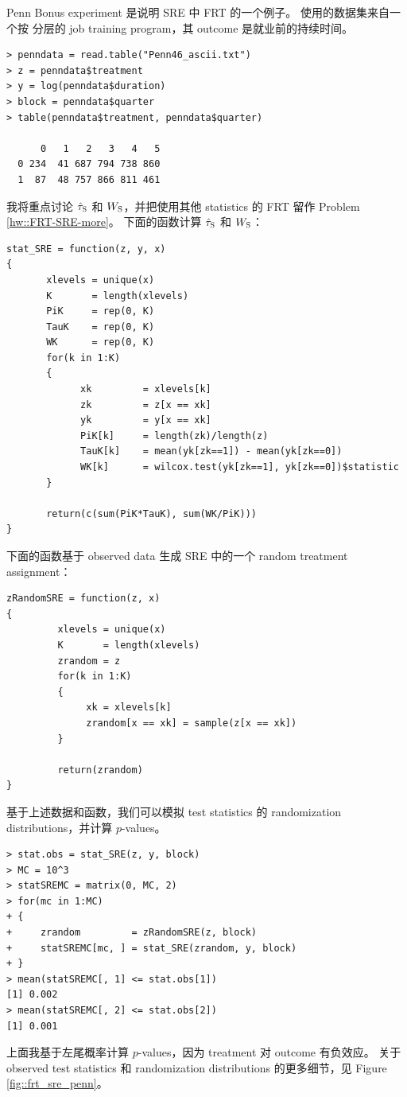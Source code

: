  
 
Penn Bonus experiment 是说明 SRE 中 FRT 的一个例子。\citet{koenker2002inference} 使用的数据集来自一个按  分层的 job training program，其 outcome 是就业前的持续时间。

\begin{lstlisting}
> penndata = read.table("Penn46_ascii.txt")
> z = penndata$treatment
> y = log(penndata$duration)
> block = penndata$quarter
> table(penndata$treatment, penndata$quarter)
   
      0   1   2   3   4   5
  0 234  41 687 794 738 860
  1  87  48 757 866 811 461
\end{lstlisting} 


我将重点讨论 $\hat{\tau}_\textsc{S}$ 和 $W_\textsc{S}$，并把使用其他 statistics 的 FRT 留作 Problem \ref{hw::FRT-SRE-more}。
下面的函数计算 $\hat{\tau}_\textsc{S}$ 和 $W_\textsc{S}$：

\begin{lstlisting}
stat_SRE = function(z, y, x)
{
       xlevels = unique(x)
       K       = length(xlevels)
       PiK     = rep(0, K)
       TauK    = rep(0, K)
       WK      = rep(0, K)
       for(k in 1:K)
       {
             xk         = xlevels[k]
             zk         = z[x == xk]
             yk         = y[x == xk]
             PiK[k]     = length(zk)/length(z)
             TauK[k]    = mean(yk[zk==1]) - mean(yk[zk==0])
             WK[k]      = wilcox.test(yk[zk==1], yk[zk==0])$statistic
       }
       
       return(c(sum(PiK*TauK), sum(WK/PiK)))
}
\end{lstlisting} 


下面的函数基于 observed data 生成 SRE 中的一个 random treatment assignment：

\begin{lstlisting}
zRandomSRE = function(z, x)
{
         xlevels = unique(x)
         K       = length(xlevels)
         zrandom = z
         for(k in 1:K)
         {
              xk = xlevels[k]   
              zrandom[x == xk] = sample(z[x == xk])
         }
         
         return(zrandom)
}
\end{lstlisting} 


基于上述数据和函数，我们可以模拟 test statistics 的 randomization distributions，并计算 $p$-values。
\begin{lstlisting}
> stat.obs = stat_SRE(z, y, block)
> MC = 10^3
> statSREMC = matrix(0, MC, 2)
> for(mc in 1:MC)
+ {
+     zrandom         = zRandomSRE(z, block) 
+     statSREMC[mc, ] = stat_SRE(zrandom, y, block)     
+ }
> mean(statSREMC[, 1] <= stat.obs[1])
[1] 0.002
> mean(statSREMC[, 2] <= stat.obs[2])
[1] 0.001
\end{lstlisting} 
上面我基于左尾概率计算 $p$-values，因为 treatment 对 outcome 有负效应。
关于 observed test statistics 和 randomization distributions 的更多细节，见 Figure \ref{fig::frt_sre_penn}。
 

